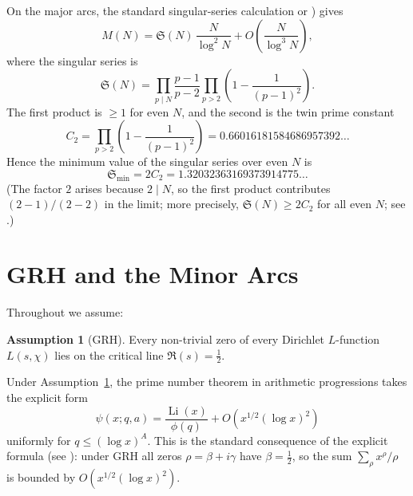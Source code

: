 \documentclass[11pt,a4paper]{article}
\theoremstyle{plain}
\theoremstyle{definition}
\newtheorem{assumption}[theorem]{Assumption}
\theoremstyle{remark}
\numberwithin{equation}{section}
\numberwithin{table}{section}
\DeclareMathOperator{\Li}{Li}
\begin{document}
On the major arcs, the standard singular-series calculation 
\cite[Ch.~3]{Vaughan1997} or \cite[Ch.~19]{IwaniecKowalski2004}) gives
\begin{equation}
  M(N) = \mathfrak{S}(N)\,\frac{N}{\log^2 N} + O\!\left(\frac{N}{\log^3 N}\right),
\end{equation}
where the singular series is
\begin{equation}
  \mathfrak{S}(N) = \prod_{p\mid N}\frac{p-1}{p-2}
  \prod_{p>2}\left(1-\frac{1}{(p-1)^2}\right).
\end{equation}
The first product is $\ge 1$ for even $N$, and the second is the twin
prime constant
\begin{equation}
  C_2 = \prod_{p>2}\left(1-\frac{1}{(p-1)^2}\right)
      = 0.66016181584686957392\ldots
\end{equation}
Hence the minimum value of the singular series over even $N$ is
\begin{equation}
  \mathfrak{S}_{\min} = 2C_2 = 1.32032363169373914775\ldots
\end{equation}
(The factor $2$ arises because $2\mid N$, so the first product contributes
$(2-1)/(2-2)$ in the limit; more precisely, $\mathfrak{S}(N)\ge 2C_2$ for
all even $N$; see \cite[\S3.2]{Vaughan1997}.)

\section{GRH and the Minor Arcs}
\label{sec:minor}

Throughout we assume:

\begin{assumption}[GRH]
\label{ass:GRH}
Every non-trivial zero of every Dirichlet $L$-function $L(s,\chi)$ lies on
the critical line $\Re(s)=\tfrac12$.
\end{assumption}

Under Assumption~\ref{ass:GRH}, the prime number theorem in arithmetic
progressions takes the explicit form
\begin{equation}
  \psi(x;q,a) = \frac{\Li(x)}{\phi(q)}
  + O\!\left(x^{1/2}(\log x)^2\right)
\end{equation}
uniformly for $q\le (\log x)^A$.  This is the standard consequence of the
explicit formula (see \cite[Ch.~20]{IwaniecKowalski2004}): under GRH all
zeros $\rho=\beta+i\gamma$ have $\beta=\tfrac12$, so the sum
$\sum_\rho x^\rho/\rho$ is bounded by $O(x^{1/2}(\log x)^2)$.
\end{document}
